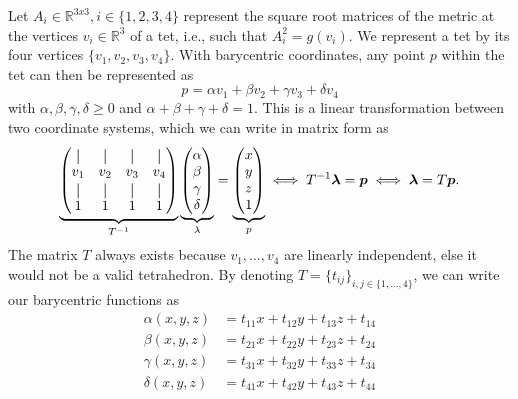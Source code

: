\documentclass[../thesis.tex]{subfiles}
\begin{document}
Let $A_i \in \mathbb{R}^{3x3}, i \in \{1,2,3,4\}$ represent the square root matrices of the metric at the vertices $v_i \in \mathbb{R}^3$ of a tet,
i.e., such that
$A^2_i = g(v_i)$. We represent a tet by its four vertices $\{v_1, v_2,v_3,v_4\}$.
With barycentric coordinates,
any point $p$ within the tet can then be represented as
$$p = \alpha v_1 + \beta v_2 + \gamma v_3 + \delta v_4$$
with $\alpha, \beta, \gamma, \delta \ge 0$ and $\alpha + \beta + \gamma + \delta = 1$.
This is a linear transformation between two coordinate systems, which we can write in matrix form as
$$\underbrace{\begin{pmatrix}
  \vertbar & \vertbar & \vertbar & \vertbar \\
  v_1 & v_2 & v_3 & v_4 \\
  \vertbar & \vertbar & \vertbar & \vertbar \\
  1 & 1 & 1 & 1
\end{pmatrix}}_{T^{-1}}
\underbrace{
\begin{pmatrix}
  \alpha \\ \beta \\ \gamma \\ \delta
\end{pmatrix}}_{\lambda} = \underbrace{\begin{pmatrix}
  x \\ y \\ z \\ 1 
\end{pmatrix}}_{p}
\iff
T^{-1}\bm{\lambda} = \bm{p} \iff  \bm{\lambda} = T\bm{p}.
$$
The matrix $T$ always exists because $v_1, \dots , v_4$ are linearly independent,
else it would not be a valid tetrahedron.
By denoting $T= \{ t_{ij} \}_{i,j \in \{ 1,\dots, 4\} }$, we can write our barycentric functions as
\begin{align*}
\alpha(x,y,z) &= t_{11}x + t_{12}y + t_{13}z + t_{14} \\
\beta(x,y,z) &= t_{21}x + t_{22}y + t_{23}z + t_{24} \\
\gamma(x,y,z) &= t_{31}x + t_{32}y + t_{33}z + t_{34} \\
\delta(x,y,z) &= t_{41}x + t_{42}y + t_{43}z + t_{44}
\end{align*}
\end{document}

